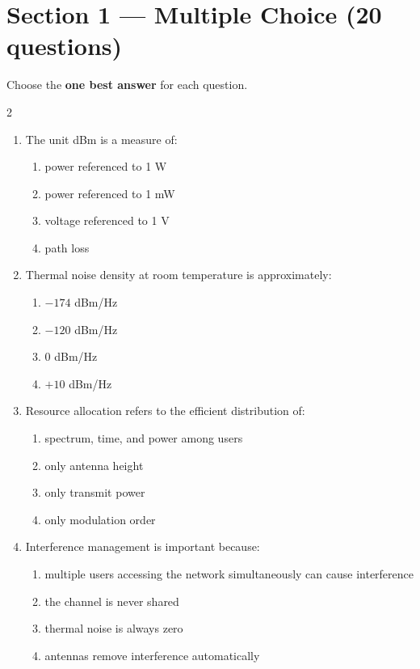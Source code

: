 \section*{Section 1 --- Multiple Choice (20 questions)}
Choose the \textbf{one best answer} for each question.

\vspace{0.3cm}
\begin{multicols}{2}
\begin{enumerate}[leftmargin=*, itemsep=0.4em]
\item The unit dBm is a measure of:
\begin{enumerate}[label=\alph*)]
\item power referenced to 1 W
\item power referenced to 1 mW
\item voltage referenced to 1 V
\item path loss
\end{enumerate}

\item Thermal noise density at room temperature is approximately:
\begin{enumerate}[label=\alph*)]
\item $-174$ dBm/Hz
\item $-120$ dBm/Hz
\item $0$ dBm/Hz
\item $+10$ dBm/Hz
\end{enumerate}

\item Resource allocation refers to the efficient distribution of:
\begin{enumerate}[label=\alph*)]
\item spectrum, time, and power among users
\item only antenna height
\item only transmit power
\item only modulation order
\end{enumerate}

\item Interference management is important because:
\begin{enumerate}[label=\alph*)]
\item multiple users accessing the network simultaneously can cause interference
\item the channel is never shared
\item thermal noise is always zero
\item antennas remove interference automatically
\end{enumerate}


\end{enumerate}
\end{multicols}

